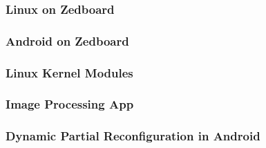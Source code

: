 \subsubsection{Linux on Zedboard}\label{sssec:linuxonzedboard}

\subsubsection{Android on Zedboard}\label{sssec:androidonzedboard}

\subsubsection{Linux Kernel Modules}\label{sssec:linuxkernelmodules}

\subsubsection{Image Processing App}\label{sssec:imageprocessingapp}

\subsubsection{Dynamic Partial Reconfiguration in Android}\label{sssec:dynamicpartialreconfiguration}

